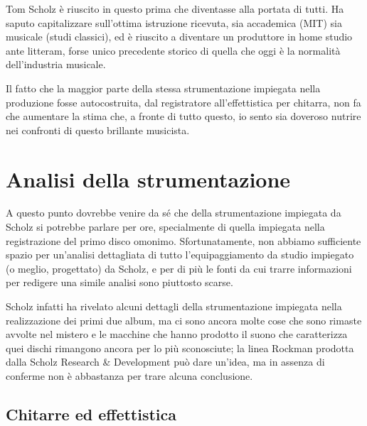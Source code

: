 \documentclass[class=book, crop=false, oneside, 12pt]{standalone}
\begin{document}
Tom Scholz è riuscito in questo prima che diventasse alla portata di tutti. Ha saputo capitalizzare sull'ottima istruzione ricevuta, sia accademica (MIT) sia musicale (studi classici), ed è riuscito a diventare un produttore in home studio ante litteram, forse unico precedente storico di quella che oggi è la normalità dell'industria musicale. 

Il fatto che la maggior parte della stessa strumentazione impiegata nella produzione fosse autocostruita, dal registratore all'effettistica per chitarra, non fa che aumentare la stima che, a fronte di tutto questo, io sento sia doveroso nutrire nei confronti di questo brillante musicista. 

\section{Analisi della strumentazione}
A questo punto dovrebbe venire da sé che della strumentazione impiegata da Scholz si potrebbe parlare per ore, specialmente di quella impiegata nella registrazione del primo disco omonimo. Sfortunatamente, non abbiamo sufficiente spazio per un'analisi dettagliata di tutto l'equipaggiamento da studio impiegato (o meglio, progettato) da Scholz, e per di più le fonti da cui trarre informazioni per redigere una simile analisi sono piuttosto scarse. 

Scholz infatti ha rivelato alcuni dettagli della strumentazione impiegata nella realizzazione dei primi due album, ma ci sono ancora molte cose che sono rimaste avvolte nel mistero e le macchine che hanno prodotto il suono che caratterizza quei dischi rimangono ancora per lo più sconosciute\cite{site:forckmanfr_story}; la linea Rockman prodotta dalla Scholz Research \& Development può dare un'idea, ma in assenza di conferme non è abbastanza per trare alcuna conclusione.

\subsection{Chitarre ed effettistica}
\end{document}

